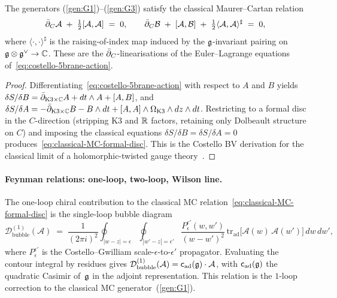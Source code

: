 \begin{proposition}
\label{prop:classical-MC-relations}
The generators
\textup{(\ref{gen:G1})--(\ref{gen:G3})} satisfy the classical
Maurer--Cartan relation
\begin{equation}
\label{eq:classical-MC-formal-disc}
\bar\partial_C \mathcal A
\;+\;
\tfrac12[\mathcal A,\mathcal A]
\;=\;
0,
\qquad
\bar\partial_C \mathcal B
\;+\;
[\mathcal A,\mathcal B]
\;+\;
\tfrac12\langle \mathcal A,\mathcal A\rangle^\sharp
\;=\;
0,
\end{equation}
where $\langle\cdot,\cdot\rangle^\sharp$ is the raising-of-index map
induced by the $\mathfrak g$-invariant pairing on $\mathfrak g\otimes\mathfrak g^\vee\to\mathbb C$.
These are the $\bar\partial_C$-linearisations of the Euler--Lagrange
equations of~\eqref{eq:costello-5brane-action}.
\end{proposition}

\begin{proof}[Proof]
Differentiating~\eqref{eq:costello-5brane-action} with respect to
$A$ and $B$ yields $\delta S/\delta B = \bar\partial_{\mathrm{K3}\times\mathbb C}A +
dt\wedge A + [A,B]$, and $\delta S/\delta A = -\bar\partial_{\mathrm{K3}\times\mathbb C}B
- B\wedge dt + [A,A]\wedge\Omega_{\mathrm{K3}}\wedge dz\wedge dt$.
Restricting to a formal disc in the $C$-direction (stripping K3 and
$\mathbb R$ factors, retaining only Dolbeault structure on $C$) and imposing
the classical equations $\delta S/\delta B = \delta S/\delta A = 0$
produces~\eqref{eq:classical-MC-formal-disc}. This is the Costello
BV derivation for the classical limit of a holomorphic-twisted gauge
theory~\cite[\S9]{Costello2011}.
\end{proof}

\paragraph{Feynman relations: one-loop, two-loop, Wilson line.}

\begin{proposition}
\label{prop:one-loop-bubble-relation}
The one-loop chiral contribution to the classical MC
relation~\eqref{eq:classical-MC-formal-disc} is the single-loop
bubble diagram
\begin{equation}
\label{eq:one-loop-bubble}
\mathcal D^{(1)}_{\mathrm{bubble}}(\mathcal A)
\;=\;
\frac{1}{(2\pi i)^2}
\oint_{|w-z|=\epsilon}
\oint_{|w'-z|=\epsilon'}
\frac{P_\epsilon^{\epsilon'}(w,w')}{(w-w')^2}\,
\mathrm{tr}_{\mathrm{ad}}\bigl[\mathcal A(w)\,\mathcal A(w')\bigr]\,
dw\,dw',
\end{equation}
where $P_\epsilon^{\epsilon'}$ is the Costello--Gwilliam
scale-$\epsilon$-to-$\epsilon'$ propagator. Evaluating the contour
integral by residues gives
$\mathcal D^{(1)}_{\mathrm{bubble}}(\mathcal A) =
\mathsf{c}_{\mathrm{ad}}(\mathfrak g)\cdot\mathcal A$, with
$\mathsf{c}_{\mathrm{ad}}(\mathfrak g)$ the quadratic Casimir of~$\mathfrak g$ in the
adjoint representation. This relation is the $1$-loop correction to the
classical MC generator~(\ref{gen:G1}).
\end{proposition}

